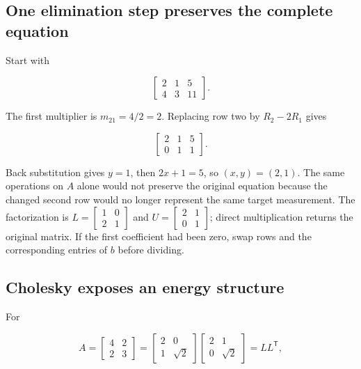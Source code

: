 \hypertarget{02-foundations-ii-ch038-board-workbench-follow-the-numbers-before-trusting-the-name}{}

\subsection{One elimination step preserves the complete equation}\label{02-foundations-ii-ch038-one-elimination-step-preserves-the-complete-equation}

\hypertarget{02-foundations-ii-ch038-one-elimination-step-preserves-the-complete-equation}{}

Start with

\[
\left[\begin{array}{cc|c}2&1&5\\4&3&11\end{array}\right].
\]

The first multiplier is \(m_{21}=4/2=2\). Replacing row two by \(R_2-2R_1\) gives

\[
\left[\begin{array}{cc|c}2&1&5\\0&1&1\end{array}\right].
\]

Back substitution gives \(y=1\), then \(2x+1=5\), so \((x,y)=(2,1)\). The same operations on \(A\) alone would not preserve the original equation because the changed second row would no longer represent the same target measurement. The factorization is \(L=\begin{bmatrix}1&0\\2&1\end{bmatrix}\) and \(U=\begin{bmatrix}2&1\\0&1\end{bmatrix}\); direct multiplication returns the original matrix. If the first coefficient had been zero, swap rows and the corresponding entries of \(b\) before dividing.

\subsection{Cholesky exposes an energy structure}\label{02-foundations-ii-ch038-cholesky-exposes-an-energy-structure}

\hypertarget{02-foundations-ii-ch038-cholesky-exposes-an-energy-structure}{}

For

\[
A=\begin{bmatrix}4&2\\2&3\end{bmatrix}
=\begin{bmatrix}2&0\\1&\sqrt2\end{bmatrix}
\begin{bmatrix}2&1\\0&\sqrt2\end{bmatrix}=LL^\mathsf T,
\]


